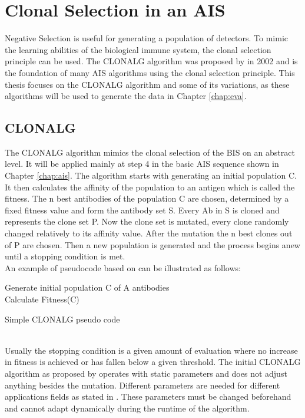 \section{Clonal Selection in an AIS}
Negative Selection is useful for generating a population of detectors. To mimic the learning abilities of the biological immune system, the clonal selection principle can be used. The CLONALG algorithm was proposed by \cite{DEC02} in 2002 and is the foundation of many AIS algorithms using the clonal selection principle. This thesis focuses on the CLONALG algorithm and some of its variations, as these algorithms will be used to generate the data in Chapter \ref{chap:eva}.
\subsection{CLONALG}
The CLONALG algorithm mimics the clonal selection of the BIS on an abstract level. It will be applied mainly at step 4 in the basic AIS sequence shown in Chapter \ref{chap:ais}. The algorithm starts with generating an initial population C. It then calculates the affinity of the population to an antigen which is called the fitness. The n best antibodies of the population C are chosen, determined by a fixed fitness value and form the antibody set S. Every Ab in S is cloned and represents the clone set P. Now the clone set is mutated, every clone randomly changed relatively to its affinity value. After the mutation the n best clones out of P are chosen. Then a new population is generated and the process begins anew until a stopping condition is met.\\
An example of pseudocode based on \cite{RIFF09} can be illustrated as follows:
\begin{algorithm}
	Generate initial population C of A antibodies\\
	Calculate Fitness(C)\\
	\caption{Simple CLONALG pseudo code}
\end{algorithm}\\
Usually the stopping condition is a given amount of evaluation where no increase in fitness is achieved or has fallen below a given threshold. The initial CLONALG algorithm as proposed by \cite{DEC02} operates with static parameters and does not adjust anything besides the mutation. Different parameters are needed for different applications fields as stated in \cite{DEC02}. These parameters must be changed beforehand and cannot adapt dynamically during the runtime of the algorithm.\\\\
